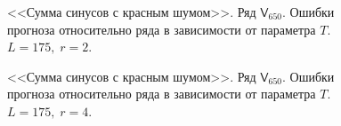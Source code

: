 \documentclass[specialist,
               substylefile = spbu.rtx,
               subf,href,colorlinks=true, 12p]{disser}
\begin{document}
\begin{figure}[H]
	\captionsetup{justification=centering}
	\caption{<<Сумма синусов с красным шумом>>. Ряд $\mathsf{V}_{650}$. Ошибки прогноза относительно ряда в зависимости от параметра $T$. $L = 175, \; r = 2$.}
\end{figure}

\begin{figure}[H]
	\captionsetup{justification=centering}
	\caption{<<Сумма синусов с красным шумом>>. Ряд $\mathsf{V}_{650}$. Ошибки прогноза относительно ряда в зависимости от параметра $T$. $L = 175, \; r = 4$.}
\end{figure}
\end{document}
